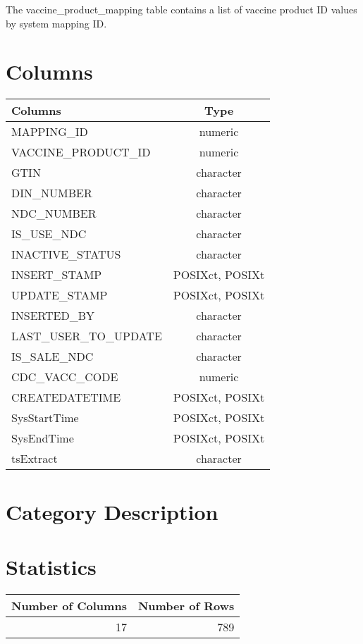 \documentclass[
  letterpaper,
  DIV=11,
  numbers=noendperiod]{scrreprt}
\begin{document}
The vaccine\_product\_mapping table contains a list of vaccine product
ID values by system mapping ID.

\hypertarget{columns-50}{%
\section*{Columns}\label{columns-50}}

\begin{longtable}{lc}
\toprule
Columns & Type \\ 
\midrule
MAPPING\_ID & numeric \\ 
VACCINE\_PRODUCT\_ID & numeric \\ 
GTIN & character \\ 
DIN\_NUMBER & character \\ 
NDC\_NUMBER & character \\ 
IS\_USE\_NDC & character \\ 
INACTIVE\_STATUS & character \\ 
INSERT\_STAMP & POSIXct, POSIXt \\ 
UPDATE\_STAMP & POSIXct, POSIXt \\ 
INSERTED\_BY & character \\ 
LAST\_USER\_TO\_UPDATE & character \\ 
IS\_SALE\_NDC & character \\ 
CDC\_VACC\_CODE & numeric \\ 
CREATEDATETIME & POSIXct, POSIXt \\ 
SysStartTime & POSIXct, POSIXt \\ 
SysEndTime & POSIXct, POSIXt \\ 
tsExtract & character \\ 
\bottomrule
\end{longtable}

\hypertarget{category-description-50}{%
\section*{Category Description}\label{category-description-50}}

\hypertarget{statistics-50}{%
\section*{Statistics}\label{statistics-50}}

\begin{longtable}{rr}
\toprule
Number of Columns & Number of Rows \\ 
\midrule
17 & 789 \\ 
\bottomrule
\end{longtable}
\end{document}
